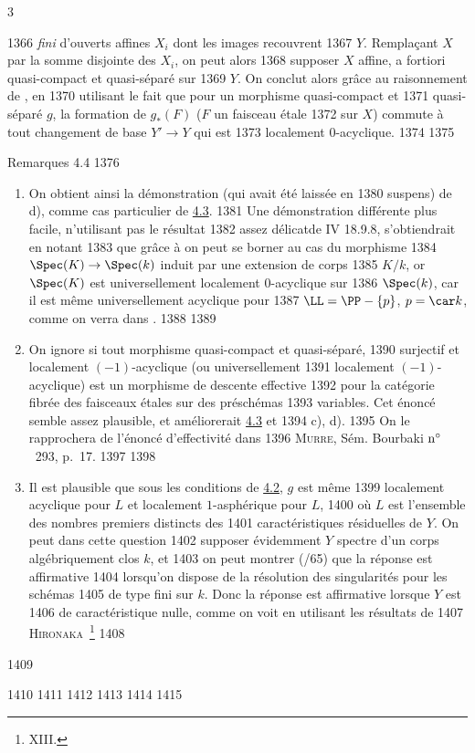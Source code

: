 3	\documentclass[10pt]{../fichiers-configuration-latex/smfart}
\begin{document}
  1366	\emph{fini} d'ouverts affines $X_i$ dont les images recouvrent
  1367	$Y$. Remplaçant $X$ par la somme disjointe des $X_i$, on peut alors
  1368	supposer $X$ affine, a fortiori quasi-compact et quasi-séparé sur
  1369	$Y$. On conclut alors grâce au raisonnement de , en
  1370	utilisant le fait  que pour un morphisme quasi-compact et
  1371	quasi-séparé $g$, la formation de $g_{\ast}(F)$ ($F$ un faisceau étale
  1372	sur $X$) commute à tout changement de base $Y'\rightarrow Y$ qui est
  1373	localement $0$-acyclique.
  1374	
  1375	\begin{enonce*}[remark]{Remarques 4.4}
  1376	\begin{enumerate}
  1377	\renewcommand{\theenumi}{\alph{enumi}}
  1378	\renewcommand{\labelenumi}{\theenumi)}
  1379	\item On obtient ainsi la démonstration (qui avait été laissée en
  1380	suspens) de  d), comme cas particulier de \hyperref[XV.cor4.3]{4.3}. %
  1381	Une démonstration différente plus facile, n'utilisant pas le résultat
  1382	assez délicat\pageoriginale de \EGA IV 18.9.8, s'obtiendrait en notant
  1383	que grâce à  on peut se borner au cas du morphisme
  1384	$\Spec(K)\rightarrow \Spec(k)$ induit par une extension de corps
  1385	$K/k$, or $\Spec(K)$ est universellement localement $0$-acyclique sur
  1386	$\Spec(k)$, car il est même universellement acyclique pour
  1387	$\LL=\PP-\{p\}$, $p=\car k$, comme on verra dans .
  1388	
  1389	\item On ignore si tout morphisme quasi-compact et quasi-séparé,
  1390	surjectif et localement $(-1)$-acyclique (ou universellement
  1391	localement $(-1)$-acyclique) est un morphisme de descente effective
  1392	pour la catégorie fibrée des faisceaux étales sur des préschémas
  1393	variables. Cet énoncé semble assez plausible, et améliorerait \hyperref[XV.cor4.3]{4.3} et
  1394	 c), d). %
  1395	On le rapprochera de l'énoncé d'effectivité dans
  1396	\textsc{Murre}, Sém. Bourbaki ${\rm n^{\circ}}$~293, p.~17.
  1397	
  1398	\item Il est plausible que sous les conditions de \hyperref[XV.cor4.2]{4.2}, $g$ est même
  1399	localement acyclique pour $L$ et localement $1$-asphérique pour $L$,
  1400	où $L$ est l'ensemble des nombres premiers distincts des
  1401	caractéristiques résiduelles de $Y$. On peut dans cette question
  1402	supposer évidemment $Y$ spectre d'un corps algébriquement clos $k$, et
  1403	on peut montrer (/65) que la réponse est affirmative
  1404	lorsqu'on dispose de la résolution des singularités pour les schémas
  1405	de type fini sur $k$. Donc la réponse est affirmative lorsque $Y$ est
  1406	de caractéristique nulle, comme on voit en utilisant les résultats de
  1407	\textsc{Hironaka}~\footnote[1]{\Cf {} XIII.}
  1408	\end{enumerate}
  1409	\end{enonce*}
  1410	
  1411	
  1412	%
  1413	%
  1414	
  1415	\ifx\danslelivre{}	
\end{document}
